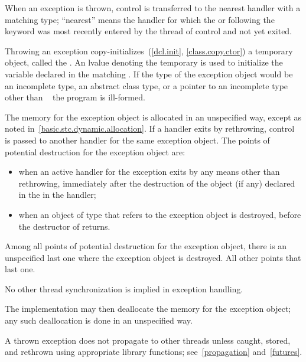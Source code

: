 \pnum
{}%
%
%
When an exception is thrown, control is transferred to the nearest handler with
a matching type; ``nearest'' means the handler
for which the
 or
following the
keyword was most recently entered by the thread of control and not yet exited.

\pnum
Throwing an exception
copy-initializes~(\ref{dcl.init}, \ref{class.copy.ctor}) a temporary object,
called the
.
An lvalue denoting the temporary is used to initialize the
variable declared in the matching
.
If the type of the exception object would be
an incomplete type,
an abstract class type,
or a pointer to an incomplete type other than \cv{}~
the program is ill-formed.

\pnum
{}%
%
%
The memory for the exception object is
allocated in an unspecified way, except as noted in~\ref{basic.stc.dynamic.allocation}.
If a handler exits by rethrowing, control is passed to another handler for
the same exception object.
The points of potential destruction for the exception object are:
\begin{itemize}
\item
when an active handler for the exception exits by
any means other than
rethrowing,
immediately after the destruction of the object (if any)
declared in the  in the handler;

\item
when an object of type 
that refers to the exception object is destroyed,
before the destructor of  returns.
\end{itemize}

Among all points of potential destruction for the exception object,
there is an unspecified last one
where the exception object is destroyed.
All other points  that last one.
\begin{note}
No other thread synchronization is implied in exception handling.
\end{note}
The implementation may then
deallocate the memory for the exception object; any such deallocation
is done in an unspecified way.
\begin{note}
A thrown exception does not
propagate to other threads unless caught, stored, and rethrown using
appropriate library functions; see~\ref{propagation} and~\ref{futures}.
\end{note}

